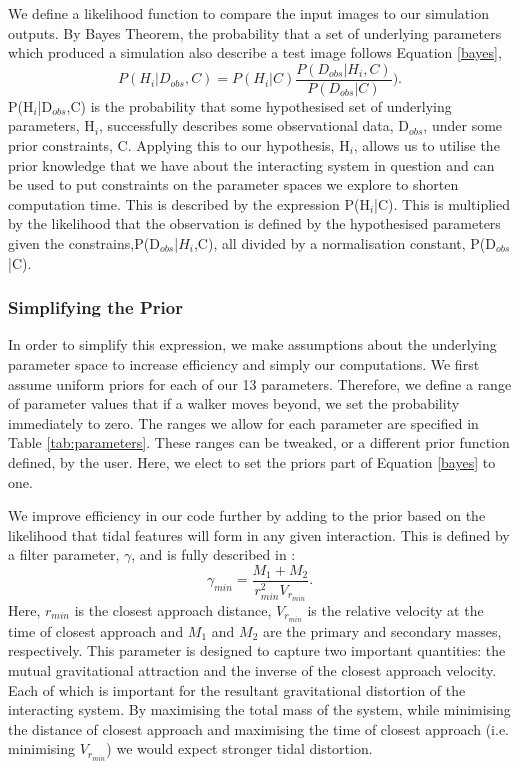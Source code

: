 We define a likelihood function to compare the input images to our simulation outputs. By Bayes Theorem, the probability that a set of underlying parameters which produced a simulation also describe a test image follows Equation \ref{bayes},
\begin{equation}\label{bayes}
P(H_{i}|D_{obs},C) = P(H_{i}|C)\frac{P(D_{obs}|H_{i},C)}{P(D_{obs}|C)}).
\end{equation}
P(H$_{i}$|D$_{obs}$,C) is the probability that some hypothesised set of underlying parameters, H$_{i}$, successfully describes some observational data, D$_{obs}$, under some prior constraints, C. Applying this to our hypothesis, H$_{i}$, allows us to utilise the prior knowledge that we have about the interacting system in question and can be used to put constraints on the parameter spaces we explore to shorten computation time. This is described by the expression P(H$_{i}$|C). This is multiplied by the likelihood that the observation is defined by the hypothesised parameters given the constrains,P(D$_{obs}$|$H_{i}$,C), all divided by a normalisation constant, P(D$_{obs}$|C).

\subsubsection{Simplifying the Prior}
In order to simplify this expression, we make assumptions about the underlying parameter space to increase efficiency and simply our computations. We first assume uniform priors for each of our 13 parameters. Therefore, we define a range of parameter values that if a walker moves beyond, we set the probability immediately to zero. The ranges we allow for each parameter are specified in Table \ref{tab:parameters}. These ranges can be tweaked, or a different prior function defined, by the user. Here, we elect to set the priors part of Equation \ref{bayes} to one.

We improve efficiency in our code further by adding to the prior based on the likelihood that tidal features will form in any given interaction. This is defined by a filter parameter, $\gamma$, and is fully described in \citet[][where it is called $\beta$ but we call it $\gamma$ here to not be confused with our star formation enhancement parameter of Equation \ref{enhancement_param}]{2016MNRAS.459..720H}:
\begin{equation}\label{gamma_param}
\gamma_{min} = \frac{M_{1} + M_{2}}{r_{min}^{2}V_{r_{min}}}.
\end{equation}
Here, $r_{min}$ is the closest approach distance, $V_{r_{min}}$ is the relative velocity at the time of closest approach and $M_{1}$ and $M_{2}$ are the primary and secondary masses, respectively. This parameter is designed to capture two important quantities: the mutual gravitational attraction and the inverse of the closest approach velocity. Each of which is important for the resultant gravitational distortion of the interacting system. By maximising the total mass of the system, while minimising the distance of closest approach and maximising the time of closest approach (i.e. minimising $V_{r_{min}}$) we would expect stronger tidal distortion. 

